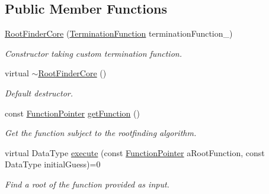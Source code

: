 \subsection*{Public Member Functions}
\begin{DoxyCompactItemize}
\item 
\hyperlink{classtudat_1_1root__finders_1_1RootFinderCore_a75afcbbb63af52f03b70c7fb5d775cda}{Root\+Finder\+Core} (\hyperlink{classtudat_1_1root__finders_1_1RootFinderCore_a8dd4dc4316b5e984e279816e0a2b67d5}{Termination\+Function} termination\+Function\+\_\+)
\begin{DoxyCompactList}\small\item\em Constructor taking custom termination function. \end{DoxyCompactList}\item 
virtual \hyperlink{classtudat_1_1root__finders_1_1RootFinderCore_ad59ff57457e8b8cf86df6617c410c6fd}{$\sim$\+Root\+Finder\+Core} ()
\begin{DoxyCompactList}\small\item\em Default destructor. \end{DoxyCompactList}\item 
const \hyperlink{classtudat_1_1root__finders_1_1RootFinderCore_af0bb889d21fa3bc55785021381d3b4b5}{Function\+Pointer} \hyperlink{classtudat_1_1root__finders_1_1RootFinderCore_a1567a12ae13f1a4bdcd964a38cc448d0}{get\+Function} ()
\begin{DoxyCompactList}\small\item\em Get the function subject to the rootfinding algorithm. \end{DoxyCompactList}\item 
virtual Data\+Type \hyperlink{classtudat_1_1root__finders_1_1RootFinderCore_a1fcd710906f66ebea649c83f08c2ae97}{execute} (const \hyperlink{classtudat_1_1root__finders_1_1RootFinderCore_af0bb889d21fa3bc55785021381d3b4b5}{Function\+Pointer} a\+Root\+Function, const Data\+Type initial\+Guess)=0
\begin{DoxyCompactList}\small\item\em Find a root of the function provided as input. \end{DoxyCompactList}\end{DoxyCompactItemize}
